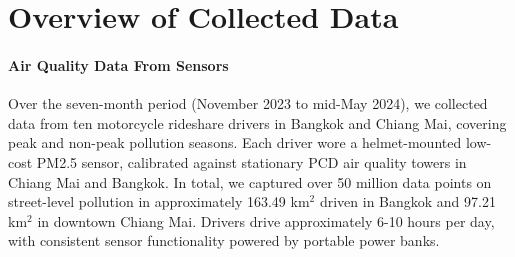 \section{Overview of Collected Data}
\label{sec:result-overview-data}

\paragraph{Air Quality Data From Sensors}
Over the seven-month period (November 2023 to mid-May 2024), we collected data from ten motorcycle rideshare drivers in Bangkok and Chiang Mai, covering peak and non-peak pollution seasons.
Each driver wore a helmet-mounted low-cost PM2.5 sensor, calibrated against stationary PCD air quality towers in Chiang Mai and Bangkok.
In total, we captured over 50 million data points on street-level pollution in approximately 163.49 km$^2$ driven in Bangkok and 97.21 km$^2$ in downtown Chiang Mai.
Drivers drive approximately 6-10 hours per day, with consistent sensor functionality powered by portable power banks.




